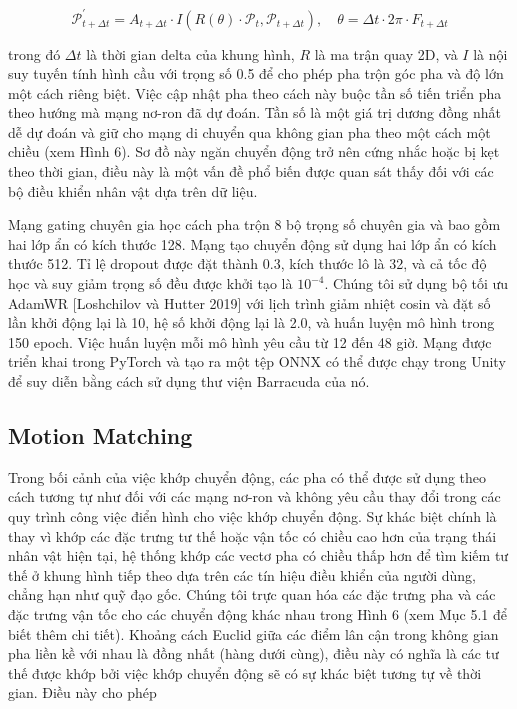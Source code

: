\begin{equation}
	\label{eq:PhaseVector}
	\mathcal{P}_{t+\Delta t}^{\prime}=A_{t+\Delta t} \cdot I\left(R(\theta) \cdot \mathcal{P}_t, \mathcal{P}_{t+\Delta t}\right), \quad \theta=\Delta t \cdot 2 \pi \cdot F_{t+\Delta t}
\end{equation}

trong đó \(\Delta t\) là thời gian delta của khung hình, \(R\) là ma trận quay 2D, và \(I\) là nội suy tuyến tính hình cầu với trọng số 0.5 để cho phép pha trộn góc pha và độ lớn một cách riêng biệt. Việc cập nhật pha theo cách này buộc tần số tiến triển pha theo hướng mà mạng nơ-ron đã dự đoán. Tần số là một giá trị dương đồng nhất dễ dự đoán và giữ cho mạng di chuyển qua không gian pha theo một cách một chiều (xem Hình 6). Sơ đồ này ngăn chuyển động trở nên cứng nhắc hoặc bị kẹt theo thời gian, điều này là một vấn đề phổ biến được quan sát thấy đối với các bộ điều khiển nhân vật dựa trên dữ liệu.

Mạng gating chuyên gia học cách pha trộn 8 bộ trọng số chuyên gia và bao gồm hai lớp ẩn có kích thước 128. Mạng tạo chuyển động sử dụng hai lớp ẩn có kích thước 512. Tỉ lệ dropout được đặt thành 0.3, kích thước lô là 32, và cả tốc độ học và suy giảm trọng số đều được khởi tạo là \(10^{-4}\). Chúng tôi sử dụng bộ tối ưu AdamWR [Loshchilov và Hutter 2019] với lịch trình giảm nhiệt cosin và đặt số lần khởi động lại là 10, hệ số khởi động lại là 2.0, và huấn luyện mô hình trong 150 epoch. Việc huấn luyện mỗi mô hình yêu cầu từ 12 đến 48 giờ. Mạng được triển khai trong PyTorch và tạo ra một tệp ONNX có thể được chạy trong Unity để suy diễn bằng cách sử dụng thư viện Barracuda của nó.


\subsection{Motion Matching}

Trong bối cảnh của việc khớp chuyển động, các pha có thể được sử dụng theo cách tương tự như đối với các mạng nơ-ron và không yêu cầu thay đổi trong các quy trình công việc điển hình cho việc khớp chuyển động. Sự khác biệt chính là thay vì khớp các đặc trưng tư thế hoặc vận tốc có chiều cao hơn của trạng thái nhân vật hiện tại, hệ thống khớp các vectơ pha có chiều thấp hơn để tìm kiếm tư thế ở khung hình tiếp theo dựa trên các tín hiệu điều khiển của người dùng, chẳng hạn như quỹ đạo gốc. Chúng tôi trực quan hóa các đặc trưng pha và các đặc trưng vận tốc cho các chuyển động khác nhau trong Hình 6 (xem Mục 5.1 để biết thêm chi tiết). Khoảng cách Euclid giữa các điểm lân cận trong không gian pha liền kề với nhau là đồng nhất (hàng dưới cùng), điều này có nghĩa là các tư thế được khớp bởi việc khớp chuyển động sẽ có sự khác biệt tương tự về thời gian. Điều này cho phép

